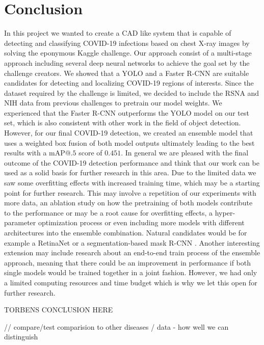 \chapter{Conclusion}\label{chapter:conclusion}

In this project we wanted to create a \ac{CAD} like system that is capable of detecting and classifying COVID-19 infections based on chest X-ray images by solving the eponymous Kaggle challenge. Our approach consist of a multi-stage approach including several deep neural networks to achieve the goal set by the challenge creators. We showed that a \ac{YOLO} and a Faster \ac{R-CNN} are suitable candidates for detecting and localizing COVID-19 regions of interests. Since the dataset required by the challenge is limited, we decided to include the \ac{RSNA} and \ac{NIH} data from previous challenges to pretrain our model weights.
We experienced that the Faster \ac{R-CNN} outperforms the \ac{YOLO} model on our test set, which is also consistent with other work in the field of object detection. However, for our final COVID-19 detection, we created an ensemble model that uses a weighted box fusion of both model outputs ultimately leading to the best results with a \ac{mAP}@$.5$ score of $0.451$. In general we are pleased with the final outcome of the COVID-19 detection performance and think that our work can be used as a solid basis for further research in this area. Due to the limited data we saw some overfitting effects with increased training time, which may be a starting point for further research. This may involve a repetition of our experiments with more data, an ablation study on how the pretraining of both models contribute to the performance or may be a root cause for overfitting effects, a hyper-parameter optimization process or even including more models with different architectures into the ensemble combination. Natural candidates would be for example a RetinaNet \autocite{lin_focal_2018} or a segmentation-based mask R-CNN \autocite{maskRcnn}.
Another interesting extension may include research about an end-to-end train process of the ensemble approach, meaning that there could be an improvement in performance if both single models would be trained together in a joint fashion. However, we had only a limited computing resources and time budget which is why we let this open for further research.

TORBENS CONCLUSION HERE

// compare/test comparision to other diseases / data - how well we can distinguish

